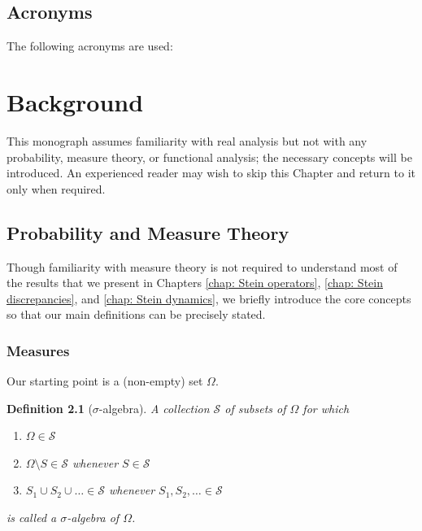 \documentclass[12pt,paper=letter]{scrreprt}
\newtheorem{definition}{Definition}[chapter]
\begin{document}
\section{Acronyms}

The following acronyms are used:%

\bigskip

\printacronyms[template=tabular,heading = none]
\chapter{Background}
\label{chap: background}


This monograph assumes familiarity with real analysis but not with any probability, measure theory, or functional analysis; the necessary concepts will be introduced.
An experienced reader may wish to skip this Chapter and return to it only when required.



\section{Probability and Measure Theory}

Though familiarity with measure theory is not required to understand most of the results that we present in Chapters \ref{chap: Stein operators}, \ref{chap: Stein discrepancies}, and \ref{chap: Stein dynamics}, we briefly introduce the core concepts so that our main definitions can be precisely stated.


\subsection{Measures}

Our starting point is a (non-empty) set $\Omega$.

\begin{definition}[$\sigma$-algebra]
A collection $\mathcal{S}$ of subsets of $\Omega$ for which
\begin{enumerate}
\item $\Omega \in \mathcal{S}$
\item $\Omega \setminus S \in \mathcal{S}$ whenever $S \in \mathcal{S}$
\item $S_1 \cup S_2 \cup \dots \in \mathcal{S}$ whenever $S_1, S_2, \dots \in \mathcal{S}$
\end{enumerate}
is called a \emph{$\sigma$-algebra} of $\Omega$.
\end{definition}
\end{document}
